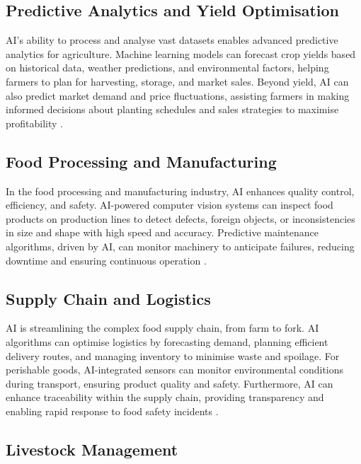 \subsection{Predictive Analytics and Yield Optimisation}

AI's ability to process and analyse vast datasets enables advanced predictive analytics for agriculture. Machine learning models can forecast crop yields based on historical data, weather predictions, and environmental factors, helping farmers to plan for harvesting, storage, and market sales. Beyond yield, AI can also predict market demand and price fluctuations, assisting farmers in making informed decisions about planting schedules and sales strategies to maximise profitability \parencite{kumar2025reviewai}.

\subsection{Food Processing and Manufacturing}

In the food processing and manufacturing industry, AI enhances quality control, efficiency, and safety. AI-powered computer vision systems can inspect food products on production lines to detect defects, foreign objects, or inconsistencies in size and shape with high speed and accuracy. Predictive maintenance algorithms, driven by AI, can monitor machinery to anticipate failures, reducing downtime and ensuring continuous operation \parencite{subedi2023ai}.

\subsection{Supply Chain and Logistics}

AI is streamlining the complex food supply chain, from farm to fork. AI algorithms can optimise logistics by forecasting demand, planning efficient delivery routes, and managing inventory to minimise waste and spoilage. For perishable goods, AI-integrated sensors can monitor environmental conditions during transport, ensuring product quality and safety. Furthermore, AI can enhance traceability within the supply chain, providing transparency and enabling rapid response to food safety incidents \parencite{singh2024artificial}.

\subsection{Livestock Management}

